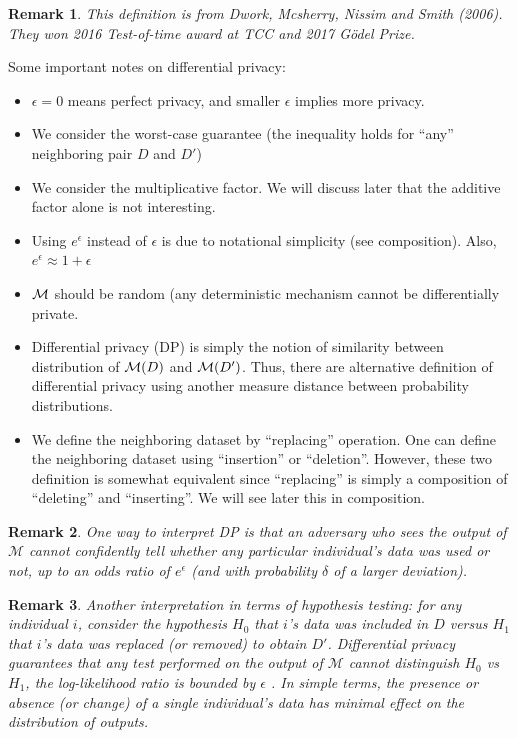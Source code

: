 \documentclass[11pt, a4paper]{article}
\newtheorem{remark}{Remark}
\begin{document}
\begin{remark}
    This definition is from Dwork, Mcsherry, Nissim and Smith (2006).
    They won 2016 Test-of-time award at TCC and 2017 G\"odel Prize.
\end{remark}

Some important notes on differential privacy:
\begin{itemize}
    \item $\epsilon=0$ means perfect privacy, and smaller $\epsilon$ implies more privacy.
    \item We consider the worst-case guarantee (the inequality holds for ``any'' neighboring pair $D$ and $D'$)
    \item We consider the multiplicative factor. We will discuss later that the additive factor alone is not interesting.
    \item Using $e^\epsilon$ instead of $\epsilon$ is due to notational simplicity (see composition). Also, $e^\epsilon\approx 1+\epsilon$
    \item ${\cal M}$ should be random (any deterministic mechanism cannot be differentially private.
    \item Differential privacy (DP) is simply the notion of similarity between distribution of ${\cal M}(D)$ and ${\cal M}(D')$.
    Thus, there are alternative definition of differential privacy using another measure distance between probability distributions.
    \item We define the neighboring dataset by ``replacing'' operation.
    One can define the neighboring dataset using ``insertion'' or ``deletion''.
    However, these two definition is somewhat equivalent since ``replacing'' is simply a composition of ``deleting'' and ``inserting''.
    We will see later this in composition.
\end{itemize}

\begin{remark}
One way to interpret DP is that an adversary who sees the output of $\mathcal{M}$ cannot confidently tell 
whether any particular individual’s data was used or not, up to an odds ratio of $e^{\epsilon}$ (and with probability $\delta$ of a larger deviation).
\end{remark}
\begin{remark}
Another interpretation in terms of hypothesis testing: 
for any individual $i$, consider the hypothesis $H_0$ that $i$'s data was included in $D$ versus $H_1$ that $i$'s data was replaced (or removed) to obtain $D'$.
Differential privacy guarantees that any test performed on the output of $\mathcal{M}$ cannot distinguish $H_0$ vs $H_1$,
the log-likelihood ratio is bounded by $\epsilon$ \cite{Wasserman2010}. 
In simple terms, the presence or absence (or change) of a single individual's data has minimal effect on the distribution of outputs.\\
\end{remark}
\end{document}
